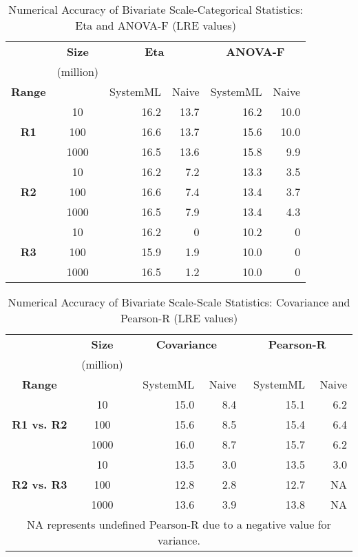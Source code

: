 \begin{table}[t]
\centering
\caption{Numerical Accuracy of Bivariate Scale-Categorical Statistics: Eta and ANOVA-F (LRE values)}
\label{tab:bivar_sc}
\begin{tabular}{|c|c|r|r|r|r|}
\hline
 & \textbf{Size} & \multicolumn{2}{|c|}{\textbf{Eta}} &  \multicolumn{2}{|c|}{\textbf{ANOVA-F}} \\
 & (million) & \multicolumn{2}{|c|}{} &  \multicolumn{2}{|c|}{} \\
\hline
\textbf{Range} & & SystemML & Naive & SystemML & Naive \\ 
\hline
             & 10   & 16.2 & 13.7 & 16.2 & 10.0 \\
\textbf{R1}  & 100  & 16.6 & 13.7 & 15.6 & 10.0 \\
             & 1000 & 16.5 & 13.6 & 15.8 & 9.9  \\
\hline
\hline
             & 10   & 16.2 & 7.2 & 13.3 & 3.5 \\
\textbf{R2}  & 100  & 16.6 & 7.4 & 13.4 & 3.7 \\
             & 1000 & 16.5 & 7.9 & 13.4 & 4.3 \\
\hline
\hline
             & 10   & 16.2 & 0   & 10.2 & 0 \\
\textbf{R3}  & 100  & 15.9 & 1.9 & 10.0 & 0 \\
             & 1000 & 16.5 & 1.2 & 10.0 & 0 \\
\hline
\end{tabular}
\end{table}


\begin{table}[t]
\centering
\caption{Numerical Accuracy of Bivariate Scale-Scale Statistics: Covariance and Pearson-R (LRE values)}
\label{tab:bivar_ss}
\begin{tabular}{|c|c|r|r|r|r|}
\hline
 & \textbf{Size} & \multicolumn{2}{|c|}{\textbf{Covariance}} &  \multicolumn{2}{|c|}{\textbf{Pearson-R}} \\
 & (million) & \multicolumn{2}{|c|}{} &  \multicolumn{2}{|c|}{} \\
\hline
\textbf{Range} & & SystemML & Naive & SystemML & Naive \\ 
\hline
                     & 10   & 15.0 &  8.4 & 15.1 &  6.2 \\
\textbf{R1 vs. R2}   & 100  & 15.6 &  8.5 & 15.4 &  6.4 \\
                     & 1000 & 16.0 &  8.7 & 15.7 &  6.2 \\
\hline
\hline
                     & 10   & 13.5 &  3.0 & 13.5  & 3.0  \\
\textbf{R2 vs. R3}   & 100  & 12.8 &  2.8 & 12.7 & NA \\
                     & 1000 & 13.6 &  3.9 & 13.8 & NA \\
\hline
\multicolumn{6}{c}{NA represents undefined Pearson-R due to a negative value for variance.}
\end{tabular}
\end{table}




